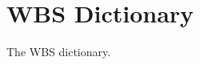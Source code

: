 \noindent
\setcounter{chapter}{3} %
\chapter{WBS Dictionary}\label{chap:dictionary}
\begin{chapterpage}
The WBS dictionary.
\end{chapterpage}

